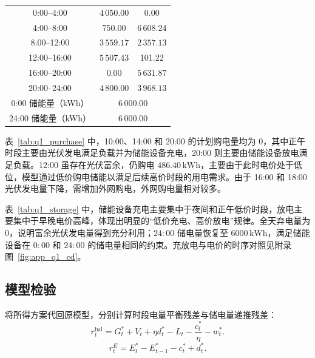 \begin{table}[htbp]
\begin{minipage}[t]{0.50\textwidth}
\begin{tabular}{ccc}
      \midrule

      0:00--4:00 & $4\,050.00$ & 0.00\\

      \rowcolor{rowblue}
      4:00--8:00 & 750.00 & $6\,608.24$\\

      8:00--12:00 & $3\,559.17$ & $2\,357.13$\\

      \rowcolor{rowblue}
      12:00--16:00 & $5\,507.43$ & 101.22\\

      16:00--20:00 & 0.00 & $5\,631.87$\\

      \rowcolor{rowblue}
      20:00--24:00 & $4\,800.00$ & $3\,968.13$\\

      \midrule

      0:00 储能量（kWh）
      & \multicolumn{2}{c}{$6\,000.00$}\\

      \rowcolor{rowblue}
      24:00 储能量（kWh）
      & \multicolumn{2}{c}{$6\,000.00$}\\

      \bottomrule
    \end{tabular}
  \end{minipage}

\end{table}

表~\ref{tab:q1_purchase} 中，10:00、14:00 和 20:00 的计划购电量均为 0，其中正午时段主要由光伏发电满足负载并为储能设备充电，20:00 则主要由储能设备放电满足负载。12:00 虽存在光伏富余，仍购电 $486.40\,\mathrm{kWh}$，主要由于此时电价处于低位，模型通过低价购电储能以满足后续高价时段的用电需求。由于 16:00 和 18:00 光伏发电量下降，需增加外网购电，外网购电量相对较多。

表~\ref{tab:q1_storage} 中，储能设备充电主要集中于夜间和正午低价时段，放电主要集中于早晚电价高峰，体现出明显的“低价充电、高价放电”规律。全天弃电量为 0，说明富余光伏发电量得到充分利用；$24{:}00$ 储电量恢复至 $6000\,\mathrm{kWh}$，满足储能设备在 $0{:}00$ 和 $24{:}00$ 的储电量相同的约束。充放电与电价的时序对照见附录图~\ref{fig:app_q1_cd}。

\subsection{模型检验}

将所得方案代回原模型，分别计算时段电量平衡残差与储电量递推残差：
\begin{equation}
r_t^{\mathrm{bal}}=G_t^{*}+V_t+\eta d_t^{*}-L_t-\frac{c_t^{*}}{\eta}-w_t^{*}.
\label{eq:balance_residual}
\end{equation}
\begin{equation}
r_t^{E}=E_t^{*}-E_{t-1}^{*}-c_t^{*}+d_t^{*}.
\label{eq:soc_residual}
\end{equation}

